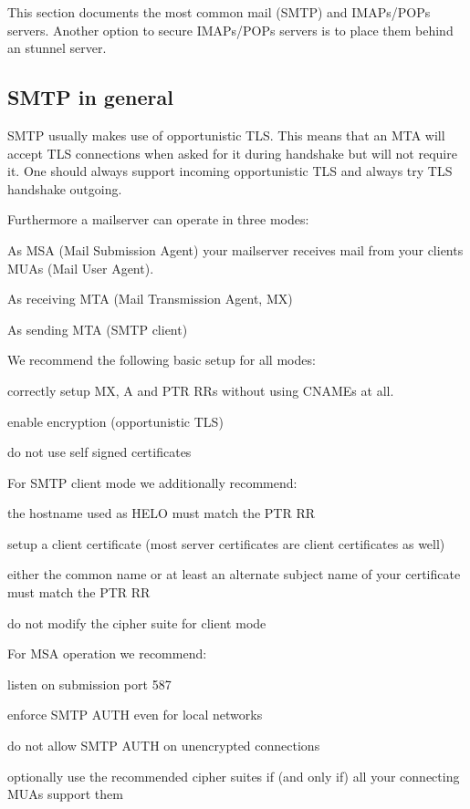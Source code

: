 \gdef\currentsectionname{MailServers}
This section documents the most common mail (SMTP) and IMAPs/POPs servers. Another option to secure IMAPs/POPs servers is to place them behind an stunnel server.


\subsection{SMTP in general}
\label{subsection:smtp_general}
SMTP usually makes use of opportunistic TLS. This means that an MTA will accept TLS connections when asked for it during handshake but will not require it. One should always support incoming opportunistic TLS and always try TLS handshake outgoing.

Furthermore a mailserver can operate in three modes:
\begin{itemize*}
  \item As MSA (Mail Submission Agent) your mailserver receives mail from your clients MUAs (Mail User Agent).
  \item As receiving MTA (Mail Transmission Agent, MX)
  \item As sending MTA (SMTP client)
\end{itemize*}
We recommend the following basic setup for all modes:
\begin{itemize*}
  \item correctly setup MX, A and PTR RRs without using CNAMEs at all.
  \item enable encryption (opportunistic TLS)
  \item do not use self signed certificates
\end{itemize*}

For SMTP client mode we additionally recommend:
\begin{itemize*}
  \item the hostname used as HELO must match the PTR RR
  \item setup a client certificate (most server certificates are client certificates as well)
  \item either the common name or at least an alternate subject name of your certificate must match the PTR RR
  \item do not modify the cipher suite for client mode
\end{itemize*}

For MSA operation we recommend:
\begin{itemize*}
  \item listen on submission port 587
  \item enforce SMTP AUTH even for local networks
  \item do not allow SMTP AUTH on unencrypted connections
  \item optionally use the recommended cipher suites if (and only if) all your connecting MUAs support them
\end{itemize*}


